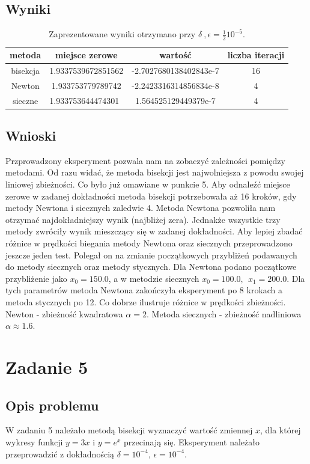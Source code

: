 \documentclass[]{article}
\begin{document}
\subsection{Wyniki}
\begin{table}[h]
	\centering
	\begin{tabular}{||c c c c||} 
		\hline
		metoda & miejsce zerowe & wartość & liczba iteracji \\ [0.5ex] 
		\hline\hline
		bisekcja & 1.9337539672851562 & -2.7027680138402843e-7 & 16 \\
		Newton & 1.933753779789742 & -2.2423316314856834e-8 & 4 \\
		sieczne & 1.933753644474301 & 1.564525129449379e-7& 4 \\
		\hline
	\end{tabular}
	\caption{Zaprezentowane wyniki otrzymano przy $\delta\:,\epsilon = \frac{1}{2}10^{-5}$.}
\end{table}
\subsection{Wnioski}
Przprowadzony eksperyment pozwala nam na zobaczyć zależności pomiędzy metodami. Od razu widać, że metoda bisekcji jest najwolniejsza z powodu swojej liniowej zbieżności. Co było już omawiane w punkcie 5. Aby odnaleźć miejsce zerowe w zadanej dokładności metoda bisekcji potrzebowała aż 16 kroków, gdy metody Newtona i siecznych zaledwie 4. Metoda Newtona pozwoliła nam otrzymać najdokładniejszy wynik (najbliżej zera). Jednakże wszystkie trzy metody zwróciły wynik mieszczący się w zadanej dokładności. Aby lepiej zbadać różnice w prędkości biegania metody Newtona oraz siecznych przeprowadzono jeszcze jeden test. Polegał on na zmianie początkowych przybliżeń podawanych do metody siecznych oraz metody stycznych. Dla Newtona podano początkowe przybliżenie jako $x_0 = 150.0$, a w metodzie siecznych $x_0 = 100.0, \:\:x_1 = 200.0$. Dla tych parametrów metoda Newtona zakończyła eksperyment po 8 krokach a metoda stycznych po 12. Co dobrze ilustruje różnice w prędkości zbieżności. Newton - zbieżność kwadratowa $\alpha = 2$. Metoda siecznych - zbieżność nadliniowa $\alpha \approx 1.6$.   
\section{Zadanie 5}
\subsection{Opis problemu}
W zadaniu 5 należało metodą bisekcji wyznaczyć wartość zmiennej $x$, dla której wykresy funkcji $y = 3x$ i $y = e^x$ przecinają się. Eksperyment należało przeprowadzić z dokładnością $\delta = 10^{-4}$, $\epsilon = 10^{-4}$.
\end{document}
